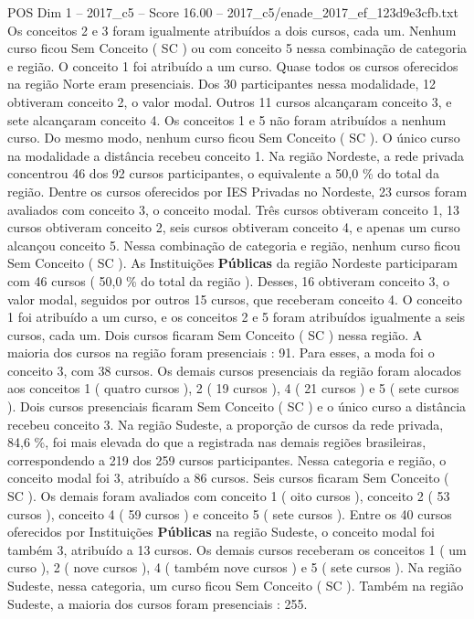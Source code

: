 \begin{textsample}{POS Dim 1 – 2017\_c5 – Score 16.00 – 2017\_c5/enade\_2017\_ef\_123d9e3cfb.txt}
Os conceitos 2 e 3 foram igualmente atribuídos a dois cursos, cada um.
Nenhum curso ficou Sem Conceito ( SC ) ou com conceito 5 nessa combinação de categoria e região.
O conceito 1 foi atribuído a um curso.
Quase todos os cursos oferecidos na região Norte eram presenciais.
Dos 30 participantes nessa modalidade, 12 obtiveram conceito 2, o valor modal.
Outros 11 cursos alcançaram conceito 3, e sete alcançaram conceito 4.
Os conceitos 1 e 5 não foram atribuídos a nenhum curso.
Do mesmo modo, nenhum curso ficou Sem Conceito ( SC ).
O único curso na modalidade a distância recebeu conceito 1.
Na região Nordeste, a rede privada concentrou 46 dos 92 cursos participantes, o equivalente a 50,0 \% do total da região.
Dentre os cursos oferecidos por IES Privadas no Nordeste, 23 cursos foram avaliados com conceito 3, o conceito modal.
Três cursos obtiveram conceito 1, 13 cursos obtiveram conceito 2, seis cursos obtiveram conceito 4, e apenas um curso alcançou conceito 5.
Nessa combinação de categoria e região, nenhum curso ficou Sem Conceito ( SC ).
As Instituições \textbf{Públicas} da região Nordeste participaram com 46 cursos ( 50,0 \% do total da região ).
Desses, 16 obtiveram conceito 3, o valor modal, seguidos por outros 15 cursos, que receberam conceito 4.
O conceito 1 foi atribuído a um curso, e os conceitos 2 e 5 foram atribuídos igualmente a seis cursos, cada um.
Dois cursos ficaram Sem Conceito ( SC ) nessa região.
A maioria dos cursos na região foram presenciais : 91.
Para esses, a moda foi o conceito 3, com 38 cursos.
Os demais cursos presenciais da região foram alocados aos conceitos 1 ( quatro cursos ), 2 ( 19 cursos ), 4 ( 21 cursos ) e 5 ( sete cursos ).
Dois cursos presenciais ficaram Sem Conceito ( SC ) e o único curso a distância recebeu conceito 3.
Na região Sudeste, a proporção de cursos da rede privada, 84,6 \%, foi mais elevada do que a registrada nas demais regiões brasileiras, correspondendo a 219 dos 259 cursos participantes.
Nessa categoria e região, o conceito modal foi 3, atribuído a 86 cursos.
Seis cursos ficaram Sem Conceito ( SC ).
Os demais foram avaliados com conceito 1 ( oito cursos ), conceito 2 ( 53 cursos ), conceito 4 ( 59 cursos ) e conceito 5 ( sete cursos ).
Entre os 40 cursos oferecidos por Instituições \textbf{Públicas} na região Sudeste, o conceito modal foi também 3, atribuído a 13 cursos.
Os demais cursos receberam os conceitos 1 ( um curso ), 2 ( nove cursos ), 4 ( também nove cursos ) e 5 ( sete cursos ).
Na região Sudeste, nessa categoria, um curso ficou Sem Conceito ( SC ).
Também na região Sudeste, a maioria dos cursos foram presenciais : 255.

\end{textsample}
